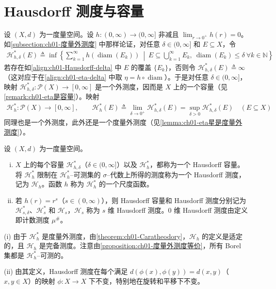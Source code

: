 \documentclass[../../main.tex]{subfiles}%
\begin{document}
\section{Hausdorff 测度与容量}\label{section:ch01-Hausdorff}

设 $(X,d)$ 为一度量空间。设 $h:(0,\infty)\to(0,\infty]$ 非减且 $\lim_{r\to0^+}h(r)=0$。如\cref{subsection:ch01-度量外测度} 中那样论证，对任意 $\delta\in(0,\infty]$ 和 $E\subseteq X$，令
\begin{align}
\mathcal{H}_{h,\delta}^*(E)\triangleq \inf\left\{\sum_{k=1}^\infty h(\operatorname{diam}(E_k))\ \middle|\ E\subseteq\bigcup_{k=1}^\infty E_k,\ \operatorname{diam}(E_k)\leqslant\delta\ \forall k\in\mathbb{N}\right\} \label{align:ch01-Hausdorff-delta}
\end{align}
若存在如\eqref{align:ch01-Hausdorff-delta} 中 $E$ 的覆盖 $\{E_k\}$，否则令 $\mathcal{H}_{h,\delta}^*(E)\triangleq \infty$（这对应于在\eqref{align:ch01-eta-delta} 中取 $\eta=h\circ\operatorname{diam}$）。于是对任意 $\delta\in(0,\infty]$，映射 $\mathcal{H}_{h,\delta}^*:\mathcal{P}(X)\to[0,\infty]$ 是一个外测度，因而是 $X$ 上的一个容量（见\cref{remark:ch01-eta是容量}）。映射
\begin{align}
\mathcal{H}_h^*:\mathcal{P}(X)\to[0,\infty],\qquad
\mathcal{H}_h^*(E)\triangleq \lim_{\delta\to0^+}\mathcal{H}_{h,\delta}^*(E)=\sup_{\delta>0}\mathcal{H}_{h,\delta}^*(E)\quad(E\subseteq X) \label{align:ch01-Hausdorff星}
\end{align}
同理也是一个外测度，此外还是一个度量外测度（见\cref{lemma:ch01-eta星是度量外测度}）。

\begin{definition}\label{definition:ch01-Hausdorff测度}
设 $(X,d)$ 为一度量空间。
\begin{enumerate}[(i)]
\item $X$ 上的每个容量 $\mathcal{H}_{h,\delta}^*$（$\delta\in(0,\infty]$）以及 $\mathcal{H}_h^*$，都称为一个 Hausdorff 容量。将 $\mathcal{H}_h^*$ 限制在 $\mathcal{H}_h^*$--可测集的 $\sigma$--代数上所得的测度称为一个 Hausdorff 测度，记为 $\mathcal{H}_h$。函数 $h$ 称为 $\mathcal{H}_h^*$ 的一个尺度函数。
\item 若 $h(r)=r^s$（$s\in(0,\infty)$），则 Hausdorff 容量和 Hausdorff 测度分别记为 $\mathcal{H}_{s,\delta}^*$、$\mathcal{H}_s^*$ 和 $\mathcal{H}_s$，$\mathcal{H}_s$ 称为 $s$ 维 Hausdorff 测度。0 维 Hausdorff 测度由定义即计数测度 $\mu^\#$。
\end{enumerate}
\end{definition}

\begin{remark}\label{remark:ch01-Hausdorff性质}
(i) 由于 $\mathcal{H}_h^*$ 是度量外测度，由\cref{theorem:ch01-Caratheodory}，$\mathcal{H}_h$ 的定义是适定的，且 $\mathcal{H}_h$ 是完备测度。注意由\cref{proposition:ch01-度量外测度等价}，所有 Borel 集都是 $\mathcal{H}_h^*$--可测的。

(ii) 由其定义，Hausdorff 测度在每个满足 $d(\phi(x),\phi(y))=d(x,y)$（$x,y\in X$）的映射 $\phi:X\to X$ 下不变，特别地在旋转和平移下不变。
\end{remark}
\end{document}
